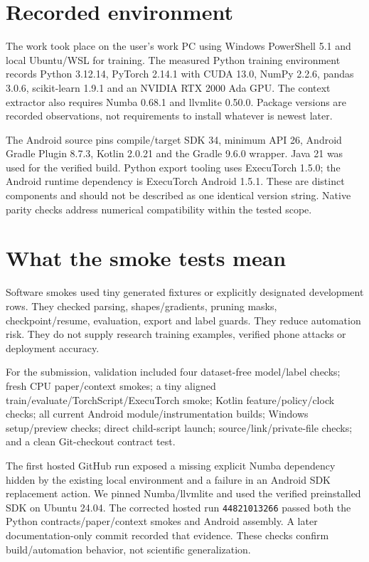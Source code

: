 \documentclass[11pt,a4paper,oneside]{report}
\newcommand{\code}[1]{\nolinkurl{#1}}
\begin{document}
\section{Recorded environment}
The work took place on the user's work PC using Windows PowerShell 5.1 and local Ubuntu/WSL for training. The measured Python training environment records Python 3.12.14, PyTorch 2.14.1 with CUDA 13.0, NumPy 2.2.6, pandas 3.0.6, scikit-learn 1.9.1 and an NVIDIA RTX 2000 Ada GPU. The context extractor also requires Numba 0.68.1 and llvmlite 0.50.0. Package versions are recorded observations, not requirements to install whatever is newest later.

The Android source pins compile/target SDK 34, minimum API 26, Android Gradle Plugin 8.7.3, Kotlin 2.0.21 and the Gradle 9.6.0 wrapper. Java 21 was used for the verified build. Python export tooling uses ExecuTorch 1.5.0; the Android runtime dependency is ExecuTorch Android 1.5.1. These are distinct components and should not be described as one identical version string. Native parity checks address numerical compatibility within the tested scope.

\section{What the smoke tests mean}
Software smokes used tiny generated fixtures or explicitly designated development rows. They checked parsing, shapes/gradients, pruning masks, checkpoint/resume, evaluation, export and label guards. They reduce automation risk. They do not supply research training examples, verified phone attacks or deployment accuracy.

For the submission, validation included four dataset-free model/label checks; fresh CPU paper/context smokes; a tiny aligned train/evaluate/TorchScript/ExecuTorch smoke; Kotlin feature/policy/clock checks; all current Android module/instrumentation builds; Windows setup/preview checks; direct child-script launch; source/link/private-file checks; and a clean Git-checkout contract test.

The first hosted GitHub run exposed a missing explicit Numba dependency hidden by the existing local environment and a failure in an Android SDK replacement action. We pinned Numba/llvmlite and used the verified preinstalled SDK on Ubuntu 24.04. The corrected hosted run \code{44821013266} passed both the Python contracts/paper/context smokes and Android assembly. A later documentation-only commit recorded that evidence. These checks confirm build/automation behavior, not scientific generalization.
\end{document}
